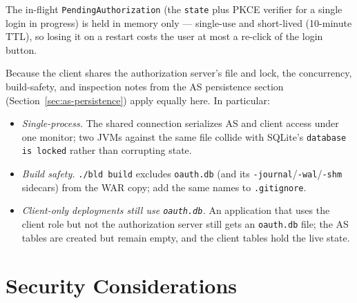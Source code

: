 \noindent
The in-flight \texttt{PendingAuthorization} (the \texttt{state} plus PKCE verifier for a single login in progress) is held in memory only --- single-use and short-lived (10-minute TTL), so losing it on a restart costs the user at most a re-click of the login button.

Because the client shares the authorization server's file and lock, the concurrency, build-safety, and inspection notes from the AS persistence section (Section~\ref{sec:as-persistence}) apply equally here.  In particular:

\begin{itemize}
  \item \emph{Single-process.}  The shared connection serializes AS and client access under one monitor; two JVMs against the same file collide with SQLite's \texttt{database is locked} rather than corrupting state.
  \item \emph{Build safety.}  \texttt{./bld build} excludes \texttt{oauth.db} (and its \texttt{-journal}/\texttt{-wal}/\texttt{-shm} sidecars) from the WAR copy; add the same names to \texttt{.gitignore}.
  \item \emph{Client-only deployments still use \texttt{oauth.db}.}  An application that uses the client role but not the authorization server still gets an \texttt{oauth.db} file; the AS tables are created but remain empty, and the client tables hold the live state.
\end{itemize}

\section{Security Considerations}
\label{sec:oc-security}

